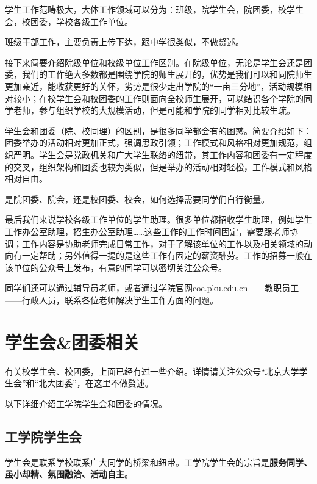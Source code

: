 \documentclass[11pt,oneside]{book}
\begin{document}
学生工作范畴极大，大体工作领域可以分为：班级，院学生会，院团委，校学生会，校团委，学校各级工作单位。

班级干部工作，主要负责上传下达，跟中学很类似，不做赘述。

接下来简要介绍院级单位和校级单位工作区别。在院级单位，无论是学生会还是团委，我们的工作绝大多数都是围绕学院的师生展开的，优势是我们可以和同院师生更加亲近，能收获更好的关怀，劣势是很少走出学院的“一亩三分地”，活动规模相对较小；在校学生会和校团委的工作则面向全校师生展开，可以结识各个学院的同学老师，参与组织学校的大规模活动，但是可能和学院的同学相对比较生疏。

学生会和团委（院、校同理）的区别，是很多同学都会有的困惑。简要介绍如下：团委举办的活动相对更加正式，强调思政引领；工作模式和风格相对更加规范，组织严明。学生会是党政机关和广大学生联络的纽带，其工作内容和团委有一定程度的交叉，组织架构和团委也较为类似，但是举办的活动相对轻松，工作模式和风格相对自由。

是院团委、院会，还是校团委、校会，如何选择需要同学们自行衡量。

最后我们来说学校各级工作单位的学生助理。很多单位都招收学生助理，例如学生工作办公室助理，招生办公室助理……这些工作的工作时间固定，需要跟老师协调；工作内容是协助老师完成日常工作，对于了解该单位的工作以及相关领域的动向有一定帮助；另外值得一提的是这些工作有固定的薪资酬劳。工作的招募一般在该单位的公众号上发布，有意的同学可以密切关注公众号。

同学们还可以通过辅导员老师，或者通过学院官网coe.pku.edu.cn——教职员工——行政人员，联系各位老师解决学生工作方面的问题。

\newpage

    \section{学生会\&团委相关}
有关校学生会、校团委，上面已经有过一些介绍。详情请关注公众号“北京大学学生会”和“北大团委”，在这里不做赘述。

以下详细介绍工学院学生会和团委的情况。


\subsection{工学院学生会}
学生会是联系学校联系广大同学的桥梁和纽带。工学院学生会的宗旨是\textbf{服务同学、虽小却精、氛围融洽、活动自主}。
\end{document}
